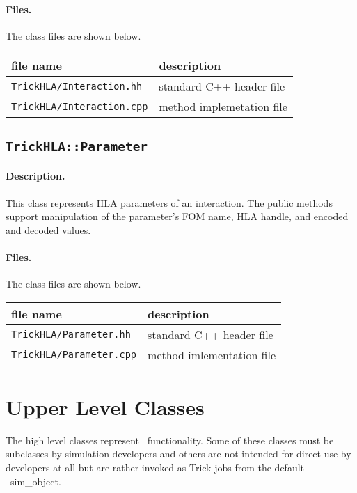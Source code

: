 \paragraph{Files.}
The class files are shown below.

{
  \scriptsize
  \begin{tabular}{|l|l|} 
    \hline
    file name & description \\
    \hline \hline
    {\tt TrickHLA/Interaction.hh} 
    & standard C++ header file
    \\ \hline
    {\tt TrickHLA/Interaction.cpp} 
    & method implemetation file
    \\ \hline
  \end{tabular}
}

\subsection{{\tt TrickHLA::Parameter}}

\paragraph{Description.}
This class represents HLA parameters of an interaction.
The public methods support manipulation of the parameter's
FOM name, HLA handle, and encoded and decoded values.

\paragraph{Files.}
The class files are shown below.
   
{
  \scriptsize
  \begin{tabular}{|l|l|} 
    \hline
    file name & description \\
    \hline \hline
    {\tt TrickHLA/Parameter.hh} 
    & standard C++ header file
    \\ \hline
    {\tt TrickHLA/Parameter.cpp} 
    & method imlementation file
    \\ \hline
  \end{tabular}
}

\section{Upper Level Classes}

The high level classes represent \TrickHLA\ functionality.
Some of these classes must be subclasses by simulation developers
and others are not intended for direct use by developers at all but are
rather invoked as Trick jobs from the default \TrickHLA\ 
{\ttfamily sim\_object}.


